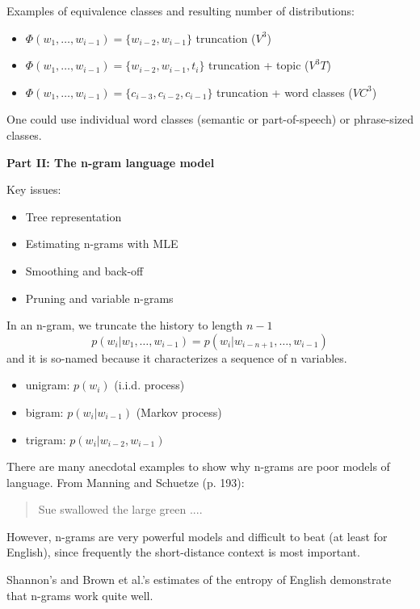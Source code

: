 \documentclass[11pt,titlepage]{article}
\begin{document}
Examples of equivalence classes and resulting number of distributions:
\begin{itemize}
\item $\Phi(w_1, \ldots , w_{i-1}) = \{ w_{i-2}, w_{i-1} \}$ truncation ($V^3$)
\item $\Phi(w_1, \ldots , w_{i-1}) = \{ w_{i-2}, w_{i-1}, t_i \}$ truncation + topic ($V^3 T$)
\item $\Phi(w_1, \ldots , w_{i-1}) = \{c_{i-3}, c_{i-2}, c_{i-1}\}$ truncation + word classes ($VC^3$)
\end{itemize}
One could use individual word classes (semantic or part-of-speech) or
phrase-sized classes.

\clearpage


\centerline{{\huge \bf Part II: The n-gram language model}}
\vskip 0.2in

Key issues:
\begin{itemize}
\item Tree representation
\item Estimating n-grams with MLE
\item Smoothing and back-off
\item Pruning and variable n-grams
\end{itemize}

\vskip 0.2in

In an n-gram, we truncate the history to length $n-1$
$$p(w_i|w_1, \ldots , w_{i-1}) = p(w_i|w_{i-n+1}, \ldots , w_{i-1})$$
and it is so-named because it characterizes a sequence of n variables.
\begin{itemize}
\item unigram: $p(w_i)$  (i.i.d. process)
\item bigram: $p(w_i|w_{i-1})$ (Markov process)
\item trigram: $p(w_i|w_{i-2},w_{i-1})$
\end{itemize}

There are many anecdotal examples to show why n-grams are poor models of language.  From Manning and Schuetze (p. 193):
\begin{quote}
Sue swallowed the large green ....
\end{quote}

\vskip 0.3in

However, n-grams are very powerful models and difficult to beat (at least for
English), since frequently the short-distance context is most
important.

Shannon's and Brown et al.'s estimates of the entropy of English demonstrate that n-grams work quite well.
\end{document}
